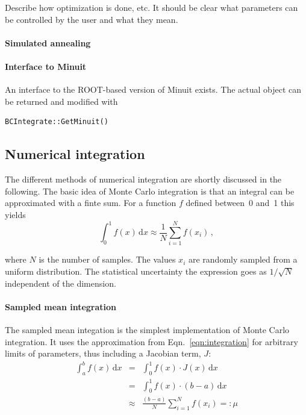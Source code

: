 \documentclass[11pt, a4paper]{article}
\begin{document}
Describe how optimization is done, etc. It should be clear what
parameters can be controlled by the user and what they mean.

\paragraph{Simulated annealing} 

\paragraph{Interface to Minuit} 

An interface to the ROOT-based version of Minuit exists. The actual
object can be returned and modified with
%
\begin{verbatim}
BCIntegrate::GetMinuit()
\end{verbatim} 


\subsection{Numerical integration} 
\label{subsection:integration} 

The different methods of numerical integration are shortly discussed
in the following. The basic idea of Monte Carlo integration is that an
integral can be approximated with a finte sum. For a function $f$
defined between~0 and~1 this yields
% 
\begin{equation}
\int_{0}^{1} f(x) \, \mathrm{d}x \approx \frac{1}{N} \sum_{i=1}^{N} f(x_{i}) \, , 
\label{eqn:integration}
\end{equation} 

\noindent 
where $N$ is the number of samples. The values $x_{i}$ are randomly
sampled from a uniform distribution. The statistical uncertainty the
expression goes as $1/\sqrt{N}$ independent of the dimension. 

\paragraph{Sampled mean integration} 

The sampled mean integation is the simplest implementation of Monte
Carlo integration. It uses the approximation from
Eqn.~\ref{eqn:integration} for arbitrary limits of parameters, thus
including a Jacobian term, $J$:
%
\begin{eqnarray}
\int_{a}^{b} f(x) \, \mathrm{d}x & = & \int_{0}^{1} f(x) \cdot J(x) \, \mathrm{d}x \\ 
                                 & = & \int_{0}^{1} f(x) \cdot (b - a) \, \mathrm{d}x \\ 
				 & \approx & \frac{(b - a)}{N} \sum_{i=1}^{N} f(x_{i}) =: \mu
\end{eqnarray} 
\end{document}
